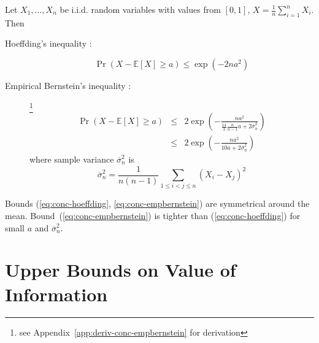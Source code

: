 \documentclass{article}
\newcommand {\IE} {\ensuremath {\mathbb{E}}}
\begin{document}
Let $X_1, \ldots, X_n$ be i.i.d. random variables with values from $[0,1]$,
$X=\frac 1 n \sum_{i=1}^n X_i$. Then 
\begin{description}
\item[Hoeffding's inequality \rm{\cite{Hoeffding.ineq}}:] 
\begin{equation}
\Pr(X-\IE[X] \ge a) \le \exp ( -2na^2)
\label{eq:conc-hoeffding}
\end{equation}
\item[Empirical Bernstein's inequality
  \rm{\cite{MaurerPontil.benrstein}}:]\footnote{see
    Appendix~\ref{app:deriv-conc-empbernstein} for derivation}
\begin{eqnarray}
\Pr(X-\IE[X] \ge a) &\le& 2\exp \left( - \frac {na^2} {\frac {14} {3}
                          \frac {n} {n-1}a+2\overline\sigma_n^2}\right)\nonumber\\
                    &\le& 2\exp \left( - \frac {na^2} {10a+2\overline\sigma_n^2}\right)
\label{eq:conc-empbernstein}
\end{eqnarray}
where sample variance $\overline\sigma_n^2$ is
\begin{equation}
\overline\sigma_n^2=\frac 1 {n(n-1)} \sum_{1\le i < j\le n}(X_i-X_j)^2
\label{eq:sample-variance}
\end{equation}
\end{description}
Bounds (\ref{eq:conc-hoeffding}, \ref{eq:conc-empbernstein}) are symmetrical
around the mean. Bound~(\ref{eq:conc-empbernstein}) is tighter than
(\ref{eq:conc-hoeffding}) for small $a$ and $\overline\sigma_n^2$. 


\section{Upper Bounds on Value of Information}
\end{document}
